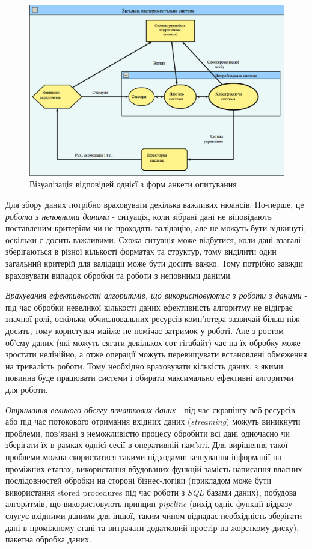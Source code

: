 \begin{figure}[h!]
  \includegraphics[width=\linewidth]{figures/fig_system.png}
  \caption{Візуалізація відповідей однієї з форм анкети опитування}
  \label{fig:answer_visualize}
\end{figure}

Для збору даних потрібно враховувати декілька важливих нюансів. По-перше, це \textit{робота з неповними даними} - ситуація, коли зібрані дані не віповідають поставленим критеріям чи не проходять валідацію, але не можуть бути відкинуті, оскільки є досить важливими. Схожа ситуація може відбутися, коли дані взагалі зберігаються в різної кількості форматах та структур, тому виділити один загальний критерій для валідації може бути досить важко. Тому потрібно завжди враховувати випадок обробки та роботи з неповними даними. 

\textit{Врахування ефективності алгоритмів, що використовуютьс з роботи з даними} - під час обробки невеликої кількості даних ефективність алгоритму не відіграє значної ролі, оскільки обчислювальних ресурсів комп'ютера зазвичай більш ніж досить, тому користувач майже не помічає затримок у роботі. Але з ростом об'єму даних (які можуть сягати декількох сот гігабайт) час на їх обробку може зростати нелінійно, а отже операції можуть перевищувати встановлені обмеження на тривалість роботи. Тому необхідно враховувати кількість даних, з якими повинна буде працювати системи і обирати максимально ефективні алгоритми для роботи.

\textit{Отримання великого обсягу початкових даних} - під час скрапінгу веб-ресурсів або під час потокового отримання вхідних даних (\textit{streaming}) можуть виникнути проблеми, пов'язані з неможливістю процесу обробити всі дані одночасно чи зберігати їх в рамках однієї сесії в оперативній пам'яті. Для вирішення такої проблеми можна скористатися такими підходами: кешування інформації на проміжних етапах, використання вбудованих функцій замість написання власних послідовностей обробки на стороні бізнес-логіки (прикладом може бути використання stored procedures під час роботи з \textit{SQL} базами даних), побудова алгоритмів, що використовують принцип \textit{pipeline} (вихід одніє функції відразу слугує вхідними даними для іншої, таким чином відпадає необхідність зберігати дані в проміжному стані та витрачати додатковий простір на жорсткому диску), пакетна обробка даних.

